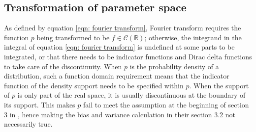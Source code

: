 \documentclass[%
 reprint,
 amsmath,amssymb,
 aps,
]{revtex4-2}
\def\R{\mathbb{R}}
\begin{document}
\subsection{\label{subsec:transformation of parameter space} Transformation of parameter space}
As defined by equation \eqref{eqn: fourier transform}, Fourier transform requires the function $p$ being transformed to be $f \in \mathcal{C}(\R)$; otherwise, the integrand in the integral of equation \eqref{eqn: fourier transform} is undefined at some parts to be integrated, or that there needs to be indicator functions and Dirac delta functions to take care of the discontinuity. When $p$ is the probability density of a distribution, such a function domain requirement means that the indicator function of the density support needs to be specified within $p$. When the support of $p$ is only part of the real space, it is usually discontinuous at the boundary of its support. This makes $p$ fail to meet the assumption at the beginning of section 3 in \cite{rotiroti2022computing}, hence making the bias and variance calculation in their section 3.2 not necessarily true.
\end{document}

